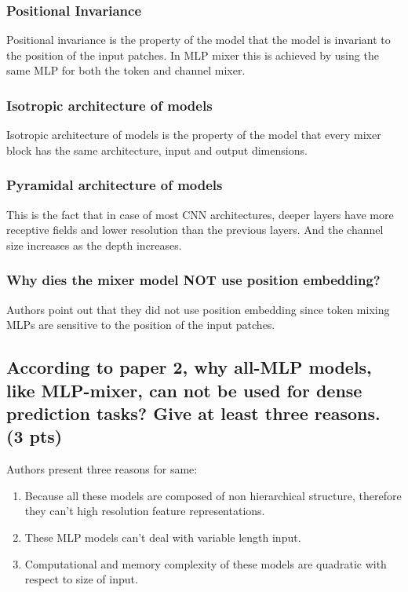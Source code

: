 \documentclass{article}
\begin{document}
\subsubsection{Positional Invariance}

Positional invariance is the property of the model that the model is invariant to the position of the input patches. In MLP mixer this is achieved by using the same MLP for both the token and channel mixer.

\subsubsection{Isotropic architecture of models}

Isotropic architecture of models is the property of the model that every mixer block has the same architecture, input and output dimensions.

\subsubsection{Pyramidal architecture of models}

This is the fact that in case of most CNN architectures, deeper layers have more receptive fields and lower resolution than the previous layers. And the channel size increases as the depth increases.

\subsubsection{Why dies the mixer model NOT use position embedding?}

Authors point out that they did not use position embedding since token mixing MLPs are sensitive to the position of the input patches.

\subsection{According to paper 2, why all-MLP models, like MLP-mixer, can not be used for dense prediction tasks? Give at least three reasons. (3 pts)}

Authors present three reasons for same:
\begin{enumerate}
    \item Because all these models are composed of non hierarchical structure, therefore they can't high resolution feature representations.
    \item These MLP models can't deal with variable length input.
    \item Computational and memory complexity of these models are quadratic with respect to size of input.
\end{enumerate}
\end{document}

